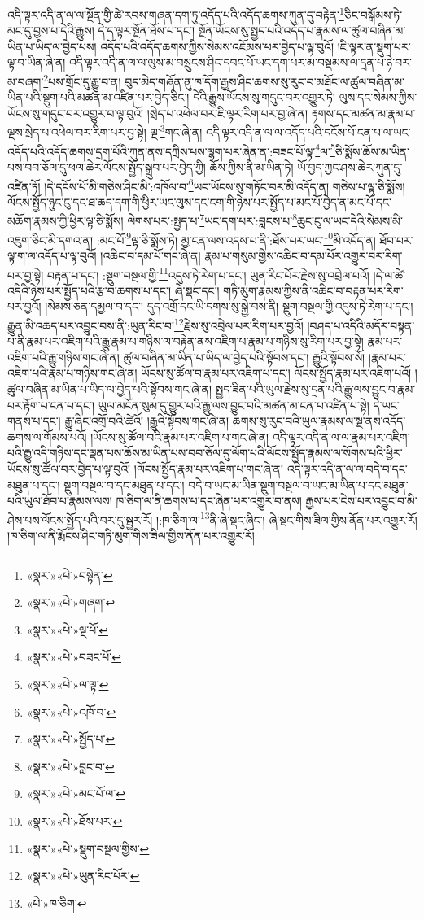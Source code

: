 འདི་ལྟར་འདི་ན་ལ་ལ་སྔོན་གྱི་ཚེ་རབས་གཞན་དག་ཏུ་འདོད་པའི་འདོད་ཆགས་ཀུན་དུ་བརྟེན་\footnote{«སྣར་»«པེ་»བསྟེན་}ཅིང་བསྒོམས་ཏེ་མང་དུ་བྱས་པ་དེའི་རྒྱུས། དེ་ད་ལྟར་སྔོན་ཐོས་པ་དང་། སྔོན་ཡོངས་སུ་སྤྱད་པའི་འདོད་པ་རྣམས་ལ་ཚུལ་བཞིན་མ་ཡིན་པ་ཡིད་ལ་བྱེད་པས། འདོད་པའི་འདོད་ཆགས་ཀྱིས་སེམས་འཇོམས་པར་བྱེད་པ་ལྟ་བུའོ། །ཇི་ལྟར་ན་སྡུག་པར་ལྟ་བ་ཡིན་ཞེ་ན། འདི་ལྟར་འདི་ན་ལ་ལ་ལུས་མ་བསྲུངས་ཤིང་དབང་པོ་ཡང་དག་པར་མ་བསྡམས་ལ་དྲན་པ་ཉེ་བར་མ་བཞག་\footnote{«སྣར་»«པེ་»གཞག་}པས་གྲོང་དུ་རྒྱུ་བ་ན། བུད་མེད་གཞོན་ནུ་ཁ་དོག་རྒྱས་ཤིང་ཆགས་སུ་རུང་བ་མཐོང་ལ་ཚུལ་བཞིན་མ་ཡིན་པའི་སྡུག་པའི་མཚན་མ་འཛིན་པར་བྱེད་ཅིང་། དེའི་རྒྱུས་ཡོངས་སུ་གདུང་བར་འགྱུར་ཏེ། ལུས་དང་སེམས་ཀྱིས་ཡོངས་སུ་གདུང་བར་འགྱུར་བ་ལྟ་བུའོ། །སྲེད་པ་འཕེལ་བར་ཇི་ལྟར་རིག་པར་བྱ་ཞེ་ན། རྟགས་དང་མཚན་མ་རྣམ་པ་ལྔས་སྲེད་པ་འཕེལ་བར་རིག་པར་བྱ་སྟེ། ལྔ་\footnote{«སྣར་»«པེ་»ལྔ་པོ་}གང་ཞེ་ན། འདི་ལྟར་འདི་ན་ལ་ལ་འདོད་པའི་དངོས་པོ་ངན་པ་ལ་ཡང་འདོད་པའི་འདོད་ཆགས་དྲག་པོའི་ཀུན་ནས་དཀྲིས་པས་ལྷག་པར་ཞེན་ན་:བཟང་པོ་ལྟ་\footnote{«སྣར་»«པེ་»བཟང་པོ་}ལ་\footnote{«སྣར་»«པེ་»ལ་ལྟ་}ཅི་སྨོས་ཆོས་མ་ཡིན་པས་བབ་ཅོལ་དུ་ཕལ་ཆེར་ལོངས་སྤྱོད་སྒྲུབ་པར་བྱེད་ཀྱི། ཆོས་ཀྱིས་ནི་མ་ཡིན་ཏེ། ཡོ་བྱད་ཀྱང་ཤས་ཆེར་ཀུན་དུ་འཛིན་ཏོ། །དེ་དངོས་པོ་མི་གཅེས་ཤིང་མི་:འཁོལ་བ་\footnote{«སྣར་»«པེ་»འཁོ་བ་}ཡང་ཡོངས་སུ་གཏོང་བར་མི་འདོད་ན། གཅེས་པ་ལྟ་ཅི་སྨོས། ལོངས་སྤྱོད་ཉུང་ངུ་དང་ཐ་ཆད་དག་གི་ཕྱིར་ཡང་ལུས་དང་ངག་གི་ཉེས་པར་སྤྱོད་པ་མང་པོ་བྱེད་ན་མང་པོ་དང་མཆོག་རྣམས་ཀྱི་ཕྱིར་ལྟ་ཅི་སྨོས། ལེགས་པར་:སྤྱད་པ་\footnote{«སྣར་»«པེ་»སྤྱོད་པ་}ཡང་དག་པར་:བླངས་པ་\footnote{«སྣར་»«པེ་»བླང་བ་}ཆུང་ངུ་ལ་ཡང་དེའི་སེམས་མི་འཇུག་ཅིང་མི་དགའ་ན། :མང་པོ་\footnote{«སྣར་»«པེ་»མང་པོ་ལ་}ལྟ་ཅི་སྨོས་ཏེ། མྱ་ངན་ལས་འདས་པ་ནི་:ཐོས་པར་ཡང་\footnote{«སྣར་»«པེ་»ཐོས་པར་}མི་འདོད་ན། ཐོབ་པར་ལྟ་ག་ལ་འདོད་པ་ལྟ་བུའོ། །འཆིང་བ་དམ་པོ་གང་ཞེ་ན། རྣམ་པ་གསུམ་གྱིས་འཆིང་བ་དམ་པོར་འགྱུར་བར་རིག་པར་བྱ་སྟེ། བརྟན་པ་དང་། :སྡུག་བསྔལ་གྱི་\footnote{«སྣར་»«པེ་»སྡུག་བསྔལ་གྱིས་}འདུས་ཏེ་རེག་པ་དང་། ཡུན་རིང་པོར་རྗེས་སུ་འབྲེལ་པའོ། །དེ་ལ་ཚེ་འདིའི་ཉེས་པར་སྤྱོད་པའི་རྩ་བ་ཆགས་པ་དང་། ཞེ་སྡང་དང་། གཏི་མུག་རྣམས་ཀྱིས་ནི་འཆིང་བ་བརྟན་པར་རིག་པར་བྱའོ། །སེམས་ཅན་དམྱལ་བ་དང་། དུད་འགྲོ་དང་ཡི་དགས་སུ་སྐྱེ་བས་ནི། སྡུག་བསྔལ་གྱི་འདུས་ཏེ་རེག་པ་དང་། རྒྱུན་མི་འཆད་པར་འབྱུང་བས་ནི་:ཡུན་རིང་བ་\footnote{«སྣར་»«པེ་»ཡུན་རིང་པོར་}རྗེས་སུ་འབྲེལ་པར་རིག་པར་བྱའོ། །བཤད་པ་འདིའི་མདོར་བསྟན་པ་ནི་རྣམ་པར་འཇིག་པའི་རྒྱུ་རྣམ་པ་གཉིས་ལ་བརྟེན་ནས་འཇིག་པ་རྣམ་པ་གཉིས་སུ་རིག་པར་བྱ་སྟེ། རྣམ་པར་འཇིག་པའི་རྒྱུ་གཉིས་གང་ཞེ་ན། ཚུལ་བཞིན་མ་ཡིན་པ་ཡིད་ལ་བྱེད་པའི་སྟོབས་དང་། རྒྱུའི་སྟོབས་སོ། །རྣམ་པར་འཇིག་པའི་རྣམ་པ་གཉིས་གང་ཞེ་ན། ཡོངས་སུ་ཚོལ་བ་རྣམ་པར་འཇིག་པ་དང་། ལོངས་སྤྱོད་རྣམ་པར་འཇིག་པའོ། །ཚུལ་བཞིན་མ་ཡིན་པ་ཡིད་ལ་བྱེད་པའི་སྟོབས་གང་ཞེ་ན། སྤྱད་ཟིན་པའི་ཡུལ་རྗེས་སུ་དྲན་པའི་རྒྱུ་ལས་བྱུང་བ་རྣམ་པར་རྟོག་པ་ངན་པ་དང་། ཡུལ་མངོན་སུམ་དུ་གྱུར་པའི་རྒྱུ་ལས་བྱུང་བའི་མཚན་མ་ངན་པ་འཛིན་པ་སྟེ། དེ་ཡང་གནས་པ་དང་། རྒྱུ་ཞིང་འགྲོ་བའི་ཚེའོ། །རྒྱུའི་སྟོབས་གང་ཞེ་ན། ཆགས་སུ་རུང་བའི་ཡུལ་རྣམས་ལ་སྔ་ནས་འདོད་ཆགས་ལ་གོམས་པའོ། །ཡོངས་སུ་ཚོལ་བའི་རྣམ་པར་འཇིག་པ་གང་ཞེ་ན། འདི་ལྟར་འདི་ན་ལ་ལ་རྣམ་པར་འཇིག་པའི་རྒྱུ་འདི་གཉིས་དང་ལྡན་པས་ཆོས་མ་ཡིན་པས་བབ་ཅོལ་དུ་ལོག་པའི་ལོངས་སྤྱོད་རྣམས་ལ་སོགས་པའི་ཕྱིར་ཡོངས་སུ་ཚོལ་བར་བྱེད་པ་ལྟ་བུའོ། །ལོངས་སྤྱོད་རྣམ་པར་འཇིག་པ་གང་ཞེ་ན། འདི་ལྟར་འདི་ན་ལ་ལ་བདེ་བ་དང་མཐུན་པ་དང་། སྡུག་བསྔལ་བ་དང་མཐུན་པ་དང་། བདེ་བ་ཡང་མ་ཡིན་སྡུག་བསྔལ་བ་ཡང་མ་ཡིན་པ་དང་མཐུན་པའི་ཡུལ་ཐོབ་པ་རྣམས་ལས། ཁ་ཅིག་ལ་ནི་ཆགས་པ་དང་ཞེན་པར་འགྱུར་བ་ནས། རྒྱས་པར་ངེས་པར་འབྱུང་བ་མི་ཤེས་པས་ལོངས་སྤྱོད་པའི་བར་དུ་སྦྱར་རོ། །:ཁ་ཅིག་ལ་\footnote{«པེ་»ཁ་ཅིག་}ནི་ཞེ་སྡང་ཞིང་། ཞེ་སྡང་གིས་ཟིལ་གྱིས་ནོན་པར་འགྱུར་རོ། །ཁ་ཅིག་ལ་ནི་རྨོངས་ཤིང་གཏི་མུག་གིས་ཟིལ་གྱིས་ནོན་པར་འགྱུར་རོ། 